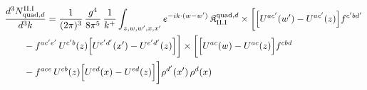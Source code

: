 \begingroup\small
\begin{align}\label{eq:H-II.I-2d}
&\frac{d^{3}N^{\rm II.I}_{{\rm quad},d}}{d^{3}k}=\frac{1}{(2\pi)^{3}}\, \frac{g^{4}}{8\pi^{5}}\, \frac{1}{k^{+}} \int_{z,w,w',x,x'}e^{-ik\cdot(w-w')}\, \mathfrak{K}^{{\rm quad},d}_{\rm II.I} \times\bigg[\Big[U^{ac'}(w')-U^{ac'}(z)\Big]f^{c'bd'}\notag\\
&\quad\quad -f^{ac'e'}\, U^{c'b}(z)\Big[U^{e'd'}(x')-U^{e'd'}(z)\Big]\bigg] \times\bigg[\Big[U^{ac}(w)-U^{ac}(z)\Big]f^{cbd}\notag\\
&\quad\quad -f^{ace}\, U^{cb}(z)\Big[U^{ed}(x)-U^{ed}(z)\Big]\bigg]\rho^{d'}(x')\, \rho^{d}(x)
\end{align}
\endgroup
